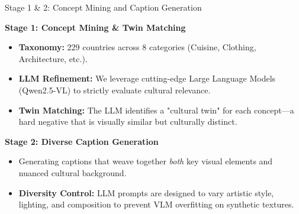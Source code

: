 \documentclass[aspectratio=169]{beamer}
\begin{document}
\begin{frame}{Stage 1 \& 2: Concept Mining and Caption Generation}
  
  \textbf{Stage 1: Concept Mining \& Twin Matching}
  \begin{itemize}
    \item \textbf{Taxonomy:} 229 countries across 8 categories (Cuisine, Clothing, Architecture, etc.).
    \item \textbf{LLM Refinement:} We leverage cutting-edge Large Language Models (Qwen2.5-VL) to strictly evaluate cultural relevance.
    \item \textbf{Twin Matching:} The LLM identifies a "cultural twin" for each concept—a hard negative that is visually similar but culturally distinct.
  \end{itemize}

  \vspace{0.4cm}
  
  \textbf{Stage 2: Diverse Caption Generation}
  \begin{itemize}
    \item Generating captions that weave together \textit{both} key visual elements and nuanced cultural background.
    \item \textbf{Diversity Control:} LLM prompts are designed to vary artistic style, lighting, and composition to prevent VLM overfitting on synthetic textures.
  \end{itemize}
  
\end{frame}
\end{document}
